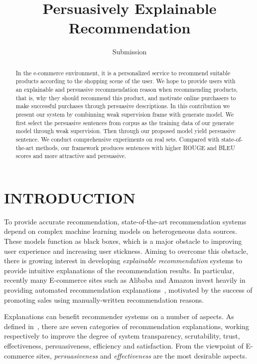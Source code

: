 \documentclass[sigconf]{acmart}
\begin{document}
\title{Persuasively Explainable Recommendation}

\author{Submission }


\begin{abstract}
In the e-commerce environment, it is a personalized service to recommend suitable products according to the shopping scene of the user. We hope to provide users with an explainable and persuasive recommendation reason when recommending products, that is, why they should recommend this product, and motivate online purchasers to make successful purchases through persuasive descriptions. In this contribution we present our system by combinning weak supervision frame with generate model.  We first select the persuasive sentences from corpus as the training data of our generate model through weak supervision. Then through our proposed model yield persuasive sentence. We conduct comprehensive experiments on real sets. Compared with state-of-the-art methods, our framework produces sentences with higher ROUGE and BLEU scores and more attractive and persuasive.

\end{abstract}



\maketitle

\section{INTRODUCTION}
To provide accurate recommendation, state-of-the-art recommendation systems depend on complex machine learning models on heterogeneous data sources. 
These models function as black boxes, which is a major obstacle to improving user experience and increasing user stickness. 
Aiming to overcome this obstacle, there is growing interest in developing \textit{explainable recommendation} systems to provide intuitive explanations of the recommendation results. 
In particular, recently many E-commerce sites such as Alibaba and Amazon invest heavily in providing automated recommendation explanations~\cite{}, motivated by the success of promoting sales using manually-written recommendation reasons. 

Explanations can benefit recommender systems on a number of aspects. As defined in~\cite{Tintarev2011Designing}, there are seven categories of recommendation explanations, working respectively to improve the degree of system transparency, scrutability, trust, effectiveness, persuasiveness, efficiency and satisfaction. 
From the viewpoint of E-commerce sites, \textit{persuasiveness} and \textit{effectiveness} are the most desirable aspects.
\end{document}
